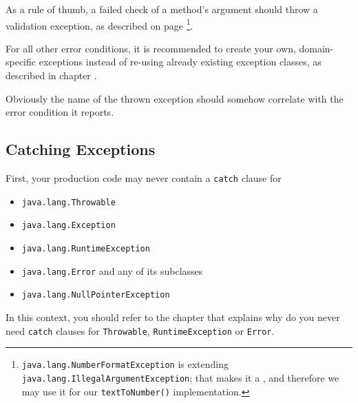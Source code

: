 As a rule of thumb, a failed check of a method's argument should throw a validation exception, as described on page \pageref{sec:ValidationExceptions}\footnote{\lstinline|java.lang.NumberFormatException| is extending \lstinline|java.lang.IllegalArgumentException|; that makes it a , and therefore we may use it for our \lstinline|textToNumber()| implementation.}.

For all other error conditions, it is recommended to create your own, domain-specific exceptions instead of re-using already existing exception classes, as described in chapter .

Obviously the name of the thrown exception should somehow correlate with the error condition it reports.


\subsection{Catching Exceptions}
First, your production code may never contain a \lstinline|catch| clause for 
\begin{itemize}[nosep]
	\item{\lstinline|java.lang.Throwable| \autocite{ORACLE_DOC_THROWABLE_CLASS}}
	\item{\lstinline|java.lang.Exception| \autocite{ORACLE_DOC_EXCEPTION_CLASS}}
	\item{\lstinline|java.lang.RuntimeException| \autocite{ORACLE_DOC_RUNTIMEEXCEPTION_CLASS}}
	\item{\lstinline|java.lang.Error| \autocite{ORACLE_DOC_ERROR_CLASS} and any of its subclasses}
	\item{\lstinline|java.lang.NullPointerException| \autocite{ORACLE_DOC_NULLPOINTEREXCEPTION_CLASS}}
\end{itemize}

In this context, you should refer to the chapter  that explains why do you never need \lstinline|catch| clauses for \lstinline|Throwable|, \lstinline|RuntimeException| or \lstinline|Error|.

